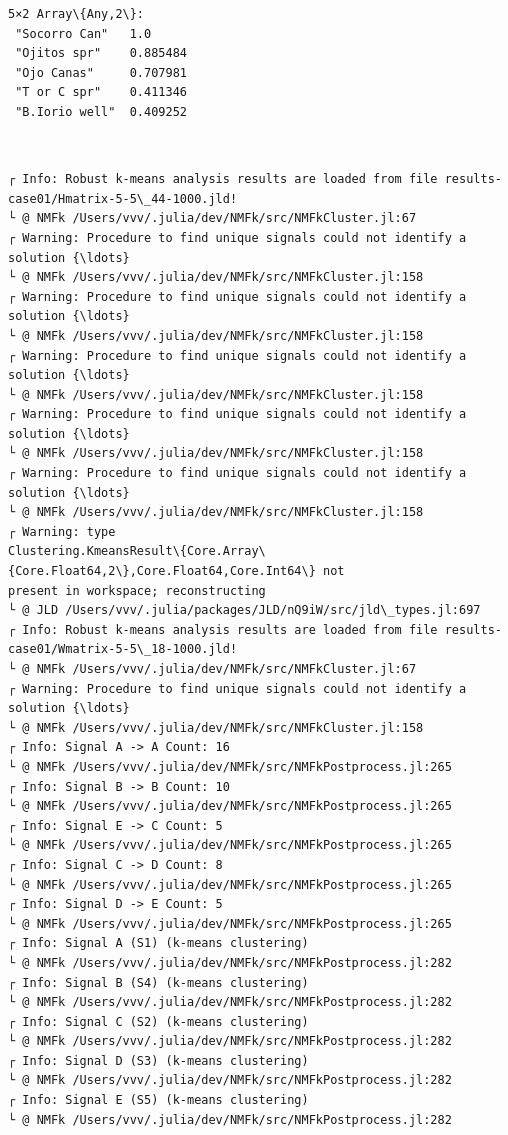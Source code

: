 \documentclass[11pt]{article}
\begin{document}
    \begin{Verbatim}[commandchars=\\\{\}]
5×2 Array\{Any,2\}:
 "Socorro Can"   1.0
 "Ojitos spr"    0.885484
 "Ojo Canas"     0.707981
 "T or C spr"    0.411346
 "B.Iorio well"  0.409252
    \end{Verbatim}


    \begin{center}
    \end{center}
    { \hspace*{\fill} \\}

    \begin{Verbatim}[commandchars=\\\{\}]
┌ Info: Robust k-means analysis results are loaded from file results-
case01/Hmatrix-5-5\_44-1000.jld!
└ @ NMFk /Users/vvv/.julia/dev/NMFk/src/NMFkCluster.jl:67
┌ Warning: Procedure to find unique signals could not identify a solution {\ldots}
└ @ NMFk /Users/vvv/.julia/dev/NMFk/src/NMFkCluster.jl:158
┌ Warning: Procedure to find unique signals could not identify a solution {\ldots}
└ @ NMFk /Users/vvv/.julia/dev/NMFk/src/NMFkCluster.jl:158
┌ Warning: Procedure to find unique signals could not identify a solution {\ldots}
└ @ NMFk /Users/vvv/.julia/dev/NMFk/src/NMFkCluster.jl:158
┌ Warning: Procedure to find unique signals could not identify a solution {\ldots}
└ @ NMFk /Users/vvv/.julia/dev/NMFk/src/NMFkCluster.jl:158
┌ Warning: Procedure to find unique signals could not identify a solution {\ldots}
└ @ NMFk /Users/vvv/.julia/dev/NMFk/src/NMFkCluster.jl:158
┌ Warning: type
Clustering.KmeansResult\{Core.Array\{Core.Float64,2\},Core.Float64,Core.Int64\} not
present in workspace; reconstructing
└ @ JLD /Users/vvv/.julia/packages/JLD/nQ9iW/src/jld\_types.jl:697
┌ Info: Robust k-means analysis results are loaded from file results-
case01/Wmatrix-5-5\_18-1000.jld!
└ @ NMFk /Users/vvv/.julia/dev/NMFk/src/NMFkCluster.jl:67
┌ Warning: Procedure to find unique signals could not identify a solution {\ldots}
└ @ NMFk /Users/vvv/.julia/dev/NMFk/src/NMFkCluster.jl:158
┌ Info: Signal A -> A Count: 16
└ @ NMFk /Users/vvv/.julia/dev/NMFk/src/NMFkPostprocess.jl:265
┌ Info: Signal B -> B Count: 10
└ @ NMFk /Users/vvv/.julia/dev/NMFk/src/NMFkPostprocess.jl:265
┌ Info: Signal E -> C Count: 5
└ @ NMFk /Users/vvv/.julia/dev/NMFk/src/NMFkPostprocess.jl:265
┌ Info: Signal C -> D Count: 8
└ @ NMFk /Users/vvv/.julia/dev/NMFk/src/NMFkPostprocess.jl:265
┌ Info: Signal D -> E Count: 5
└ @ NMFk /Users/vvv/.julia/dev/NMFk/src/NMFkPostprocess.jl:265
┌ Info: Signal A (S1) (k-means clustering)
└ @ NMFk /Users/vvv/.julia/dev/NMFk/src/NMFkPostprocess.jl:282
┌ Info: Signal B (S4) (k-means clustering)
└ @ NMFk /Users/vvv/.julia/dev/NMFk/src/NMFkPostprocess.jl:282
┌ Info: Signal C (S2) (k-means clustering)
└ @ NMFk /Users/vvv/.julia/dev/NMFk/src/NMFkPostprocess.jl:282
┌ Info: Signal D (S3) (k-means clustering)
└ @ NMFk /Users/vvv/.julia/dev/NMFk/src/NMFkPostprocess.jl:282
┌ Info: Signal E (S5) (k-means clustering)
└ @ NMFk /Users/vvv/.julia/dev/NMFk/src/NMFkPostprocess.jl:282
    \end{Verbatim}
\end{document}
